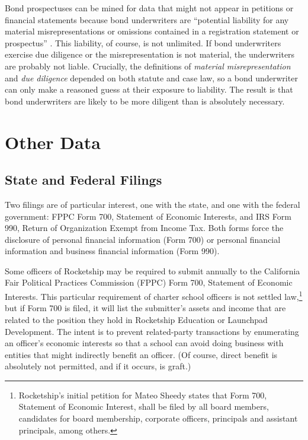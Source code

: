 Bond prospectuses can be mined for data that might not appear in petitions or financial statements because bond underwriters are ``potential liability for any material misrepresentations or omissions contained in a registration statement or prospectus'' \parencite{Block.etal2008}. This liability, of course, is not unlimited. If bond underwriters exercise due diligence or the misrepresentation is not material, the underwriters are probably not liable. Crucially, the definitions of \textit{material misrepresentation} and \textit{due diligence} depended on both statute and case law, so a bond underwriter can only make a reasoned guess at their exposure to liability. The result is that bond underwriters are likely to be more diligent than is absolutely necessary.

\section{Other Data}\label{other-data}\indent%

\subsection{State and Federal Filings}\label{sec:state-federal-filings}\indent%

Two filings are of particular interest, one with the state, and one with the federal government: FPPC Form 700, Statement of Economic Interests, and IRS Form 990, Return of Organization Exempt from Income Tax. Both forms force the disclosure of personal financial information (Form 700) or personal financial information and business financial information (Form 990). 

Some officers of Rocketship may be required to submit annually to the California Fair Political Practices Commission (FPPC) Form 700, Statement of Economic Interests. This particular requirement of charter school officers is not settled law,\footnote{Rocketship's initial petition for Mateo Sheedy states that Form 700, Statement of Economic Interest, shall be filed by all board members, candidates for board membership, corporate officers, principals and assistant principals, among others.} but if Form 700 is filed, it will list the submitter's assets and income that are related to the position they hold in Rocketship Education or Launchpad Development. The intent is to prevent related-party transactions by enumerating an officer's economic interests so that a school can avoid doing business with entities that might indirectly benefit an officer. (Of course, direct benefit is absolutely not permitted, and if it occurs, is graft.)  

